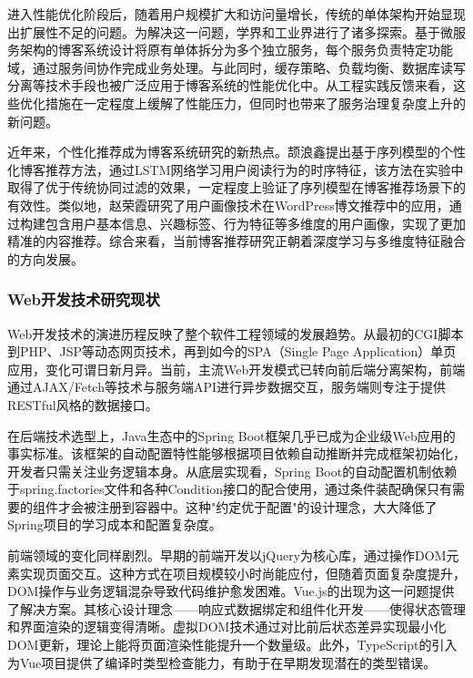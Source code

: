 \documentclass[UTF8,AutoFakeBold=1,AutoFakeSlant,zihao=-4]{SCAU}
\begin{document}
 进入性能优化阶段后，随着用户规模扩大和访问量增长，传统的单体架构开始显现出扩展性不足的问题。为解决这一问题，学界和工业界进行了诸多探索。基于微服务架构的博客系统设计将原有单体拆分为多个独立服务，每个服务负责特定功能域，通过服务间协作完成业务处理{\citep{Lyu2025}}。与此同时，缓存策略、负载均衡、数据库读写分离等技术手段也被广泛应用于博客系统的性能优化中{\citep{Vashisht2025}}。从工程实践反馈来看，这些优化措施在一定程度上缓解了性能压力，但同时也带来了服务治理复杂度上升的新问题。

 近年来，个性化推荐成为博客系统研究的新热点。颉浪鑫{\citep{颉浪鑫2023}}提出基于序列模型的个性化博客推荐方法，通过LSTM网络学习用户阅读行为的时序特征，该方法在实验中取得了优于传统协同过滤的效果，一定程度上验证了序列模型在博客推荐场景下的有效性。类似地，赵荣霞{\citep{赵荣霞2018}}研究了用户画像技术在WordPress博文推荐中的应用，通过构建包含用户基本信息、兴趣标签、行为特征等多维度的用户画像，实现了更加精准的内容推荐。综合来看，当前博客推荐研究正朝着深度学习与多维度特征融合的方向发展。

 \subsubsection{Web开发技术研究现状}

 Web开发技术的演进历程反映了整个软件工程领域的发展趋势。从最初的CGI脚本到PHP、JSP等动态网页技术，再到如今的SPA（Single Page Application）单页应用，变化可谓日新月异。当前，主流Web开发模式已转向前后端分离架构，前端通过AJAX/Fetch等技术与服务端API进行异步数据交互，服务端则专注于提供RESTful风格的数据接口{\citep{Yi2020}}{\citep{Guo2024}}。

 在后端技术选型上，Java生态中的Spring Boot框架几乎已成为企业级Web应用的事实标准。该框架的自动配置特性能够根据项目依赖自动推断并完成框架初始化，开发者只需关注业务逻辑本身。从底层实现看，Spring Boot的自动配置机制依赖于spring.factories文件和各种Condition接口的配合使用，通过条件装配确保只有需要的组件才会被注册到容器中{\citep{罗涛2020}}。这种"约定优于配置"的设计理念，大大降低了Spring项目的学习成本和配置复杂度。

 前端领域的变化同样剧烈。早期的前端开发以jQuery为核心库，通过操作DOM元素实现页面交互。这种方式在项目规模较小时尚能应付，但随着页面复杂度提升，DOM操作与业务逻辑混杂导致代码维护愈发困难。Vue.js的出现为这一问题提供了解决方案。其核心设计理念——响应式数据绑定和组件化开发——使得状态管理和界面渲染的逻辑变得清晰。虚拟DOM技术通过对比前后状态差异实现最小化DOM更新，理论上能将页面渲染性能提升一个数量级{\citep{曾广海2016}}。此外，TypeScript的引入为Vue项目提供了编译时类型检查能力，有助于在早期发现潜在的类型错误。
\end{document}
